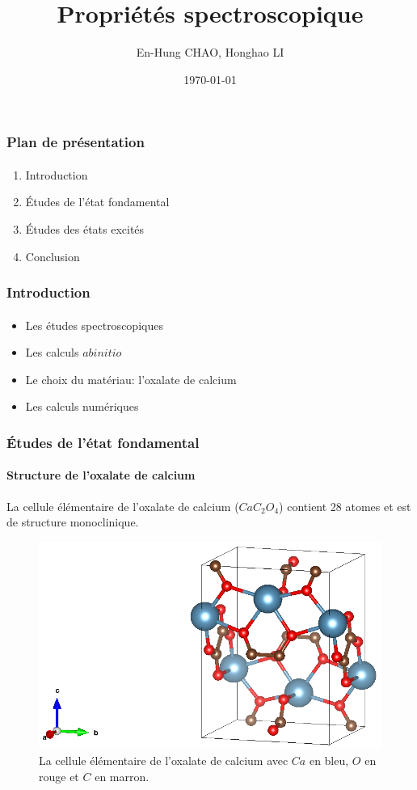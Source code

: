 \documentclass[a4paper, 12pt, twoside, titlepage, french]{beamer}
\title{Propriétés spectroscopique}
\author{En-Hung CHAO, Honghao LI}
\institute{École Polytechnique}
\date{\today}
\begin{document}
\begin{frame}
\titlepage
\end{frame}
\begin{frame}
\frametitle{Plan de présentation}
\framesubtitle{}
\begin{enumerate}
\item Introduction
\item Études de l'état fondamental
\item Études des états excités
\item Conclusion 
\end{enumerate}
\end{frame}

\begin{frame}
\frametitle{Introduction}
\framesubtitle{}
\begin{itemize}
\item Les études spectroscopiques
\item Les calculs $ab initio$
\item Le choix du matériau: l'oxalate de calcium
\item Les calculs numériques
\end{itemize}
\end{frame}
\newpage

\begin{frame}
\frametitle{Études de l'état fondamental}
\framesubtitle{Structure de l'oxalate de calcium}
La cellule élémentaire de l'oxalate de calcium ($CaC_2O_4$) contient 28 atomes et est de structure monoclinique.
\begin{figure}[!h]
  \centering
  \includegraphics[height=0.4\textheight]{co_structure}
  \caption{La cellule élémentaire de l'oxalate de calcium avec $Ca$ en bleu, $O$ en rouge et $C$ en marron.}\label{BrillouinZone}
\end{figure}
\end{frame}
\newpage
\end{document}
